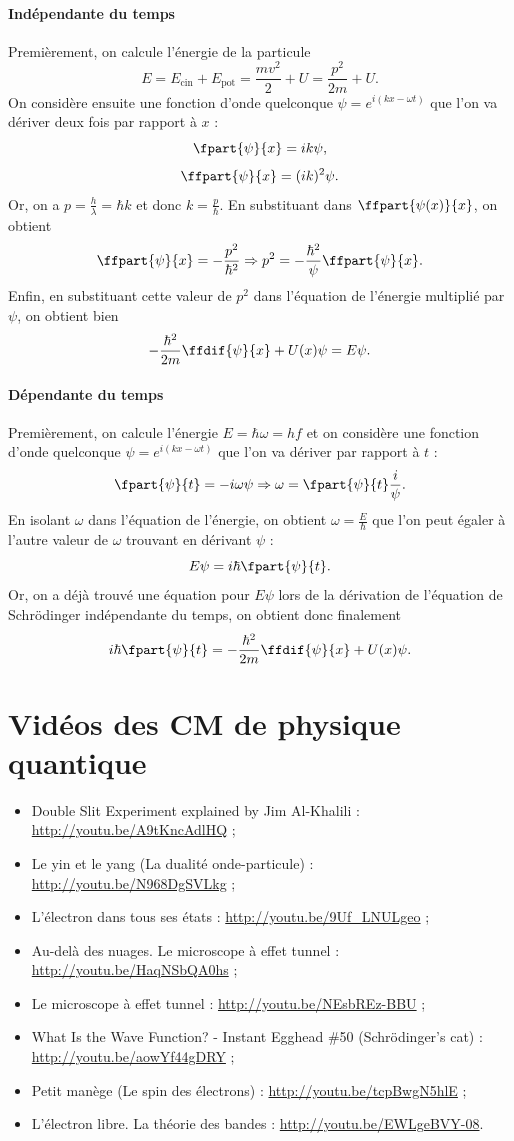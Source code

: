 \paragraph{Indépendante du temps}
Premièrement, on calcule l'énergie de la particule
\[ E = E_{\text{cin}} + E_{\text{pot}} = \frac{mv^2}{2} + U = \frac{p^2}{2m} + U.\]
On considère ensuite une fonction d'onde quelconque $\psi = e^{i(kx-\omega t)}$
que l'on va dériver deux fois par rapport à $x$ :
\[ \fpart{\psi}{x} = ik\psi ,\]
\[ \ffpart{\psi}{x} = (ik)^2\psi. \]
Or, on a $p = \frac{h}{\lambda} = \hbar k$ et donc $k = \frac{p}{\hbar}$.
En substituant dans $\ffpart{\psi(x)}{x}$, on obtient
\[ \ffpart{\psi}{x} = -\frac{p^2}{\hbar^2} \Rightarrow p^2 =
-\frac{\hbar^2}{\psi}\ffpart{\psi}{x}.\]
Enfin, en substituant cette valeur de $p^2$ dans l'équation de l'énergie
multiplié par $\psi$, on obtient bien
\[ -\frac{\hbar^2}{2m}\ffdif{\psi}{x} + U(x)\psi = E\psi.\]

\paragraph{Dépendante du temps}
Premièrement, on calcule l'énergie $E = \hbar\omega = hf$ et on
considère une fonction d'onde quelconque $\psi = e^{i(kx-\omega t)}$
que l'on va dériver par rapport à $t$ :
\[ \fpart{\psi}{t} = -i\omega\psi \Rightarrow \omega = \fpart{\psi}{t}\frac{i}{\psi}.\]
En isolant $\omega$ dans l'équation de l'énergie, on obtient $\omega = \frac{E}{\hbar}$
que l'on peut égaler à l'autre valeur de $\omega$ trouvant en dérivant $\psi$ :
\[ E\psi = i\hbar\fpart{\psi}{t}.\]
Or, on a déjà trouvé une équation pour $E\psi$ lors de la dérivation de l'équation
de Schrödinger indépendante du temps, on obtient donc finalement
\[ i\hbar\fpart{\psi}{t} = -\frac{\hbar^2}{2m}\ffdif{\psi}{x} + U(x)\psi.\]

\section{Vidéos des CM de physique quantique}
\label{sec:videos}
\begin{itemize}
	\item Double Slit Experiment explained by Jim Al-Khalili :
	\url{http://youtu.be/A9tKncAdlHQ} ;
	\item Le yin et le yang (La dualité onde-particule) :
	\url{http://youtu.be/N968DgSVLkg} ;
	\item L'électron dans tous ses états :
	\url{http://youtu.be/9Uf_LNULgeo} ;
	\item Au-delà des nuages. Le microscope à effet tunnel :
	\url{http://youtu.be/HaqNSbQA0hs} ;
	\item Le microscope à effet tunnel :
	\url{http://youtu.be/NEsbREz-BBU} ;
	\item What Is the Wave Function? - Instant Egghead \#50
	(Schrödinger's cat) : \url{http://youtu.be/aowYf44gDRY} ;
	\item Petit manège (Le spin des électrons) :
	\url{http://youtu.be/tcpBwgN5hlE} ;
	\item L'électron libre. La théorie des bandes :
	\url{http://youtu.be/EWLgeBVY-08}.
\end{itemize}

